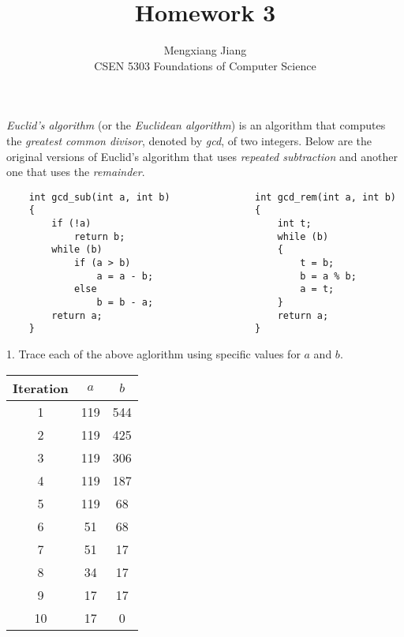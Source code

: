 \documentclass[12pt]{article}
\newenvironment{problem}[2][Problem]{\begin{trivlist}
\item[\hskip \labelsep {\bfseries #1}\hskip \labelsep {\bfseries #2.}]}{\end{trivlist}}
\begin{document}
 
 
\title{Homework 3}%
\author{Mengxiang Jiang\\ %
CSEN 5303 Foundations of Computer Science} %
 
\maketitle
 
\begin{problem}{1} %
\emph{Euclid's algorithm} (or the \emph{Euclidean algorithm}) is an algorithm that computes the \emph{greatest common divisor}, 
denoted by \emph{gcd}, of two integers. Below are the original versions of Euclid's algorithm that uses \emph{repeated subtraction}
and another one that uses the \emph{remainder}.
\begin{verbatim}
    int gcd_sub(int a, int b)               int gcd_rem(int a, int b)
    {                                       {
        if (!a)                                 int t;
            return b;                           while (b)
        while (b)                               {
            if (a > b)                              t = b;
                a = a - b;                          b = a % b;
            else                                    a = t;
                b = b - a;                      }
        return a;                               return a;
    }                                       }
\end{verbatim}
1. Trace each of the above aglorithm using specific values for $a$ and $b$.
\begin{center}
    \begin{tabular}{|c c c|} 
        \hline
        Iteration & $a$ & $b$ \\
        \hline
        1 & 119 & 544 \\ 
        2 & 119 & 425 \\
        3 & 119 & 306 \\
        4 & 119 & 187 \\
        5 & 119 & 68 \\
        6 & 51 & 68 \\
        7 & 51 & 17 \\
        8 & 34 & 17 \\
        9 & 17 & 17 \\
        10 & 17 & 0 \\
        \hline
    \end{tabular}


\end{center}
\end{problem}
\end{document}
